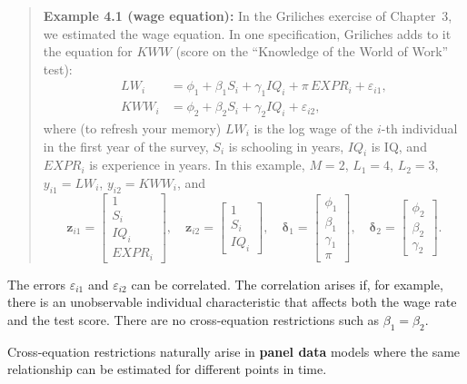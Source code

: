 \begin{quote}
\textbf{Example 4.1 (wage equation):}\quad
In the Griliches exercise of Chapter~3, we estimated the wage equation.
In one specification, Griliches adds to it the equation for $KWW$ (score on the
``Knowledge of the World of Work'' test):
\begin{align*}
LW_i &= \phi_1 + \beta_1 S_i + \gamma_1 IQ_i + \pi\, EXPR_i + \varepsilon_{i1}, \\
KWW_i &= \phi_2 + \beta_2 S_i + \gamma_2 IQ_i + \varepsilon_{i2},
\end{align*}
where (to refresh your memory) $LW_i$ is the log wage of the $i$-th individual in
the first year of the survey, $S_i$ is schooling in years, $IQ_i$ is IQ, and $EXPR_i$ is
experience in years. In this example, $M = 2$, $L_1 = 4$, $L_2 = 3$,
$y_{i1} = LW_i$, $y_{i2} = KWW_i$, and
\begin{equation}
\mathbf{z}_{i1} = \begin{bmatrix} 1 \\ S_i \\ IQ_i \\ EXPR_i \end{bmatrix}, \quad
\mathbf{z}_{i2} = \begin{bmatrix} 1 \\ S_i \\ IQ_i \end{bmatrix}, \quad
\boldsymbol{\delta}_1 = \begin{bmatrix} \phi_1 \\ \beta_1 \\ \gamma_1 \\ \pi \end{bmatrix}, \quad
\boldsymbol{\delta}_2 = \begin{bmatrix} \phi_2 \\ \beta_2 \\ \gamma_2 \end{bmatrix}.
\label{eq:4.1.2}
\end{equation}
\end{quote}

The errors $\varepsilon_{i1}$ and $\varepsilon_{i2}$ can be correlated. The correlation arises if, for example,
there is an unobservable individual characteristic that affects both the
wage rate and the test score. There are no cross-equation restrictions such as
$\beta_1 = \beta_2$.

Cross-equation restrictions naturally arise in \textbf{panel data} models where the
same relationship can be estimated for different points in time.

